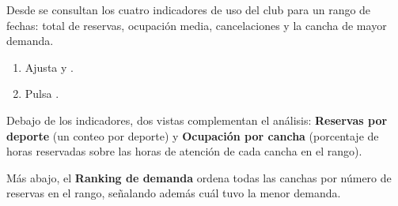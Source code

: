 Desde  se consultan los cuatro indicadores de uso del
club para un rango de fechas: total de reservas, ocupación media,
cancelaciones y la cancha de mayor demanda.

\begin{enumerate}
  \item Ajusta  y .
  \item Pulsa .
\end{enumerate}


Debajo de los indicadores, dos vistas complementan el análisis:
\textbf{Reservas por deporte} (un conteo por deporte) y
\textbf{Ocupación por cancha} (porcentaje de horas reservadas sobre las
horas de atención de cada cancha en el rango).

Más abajo, el \textbf{Ranking de demanda} ordena todas las canchas por
número de reservas en el rango, señalando además cuál tuvo la menor
demanda.


